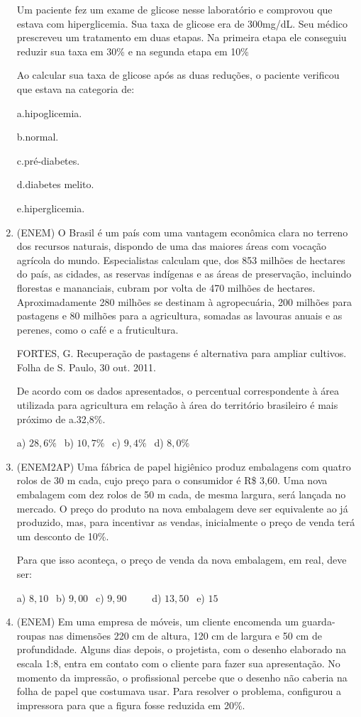 \begin{multicols*}{2}
\begin{enumerate}
Um paciente fez um exame de glicose nesse laboratório e comprovou que estava com hiperglicemia. Sua taxa de
glicose era de 300mg/dL. Seu médico prescreveu um tratamento em duas etapas. Na primeira etapa ele
conseguiu reduzir sua taxa em 30\% e na segunda etapa em 10\%

Ao calcular sua taxa de glicose após as duas reduções, o paciente verificou que estava na categoria de:

a.hipoglicemia.

b.normal.

c.pré-diabetes.

d.diabetes melito.

e.hiperglicemia.


		\item (ENEM) O Brasil é um país com uma vantagem econômica clara no terreno dos recursos naturais, dispondo de uma das maiores áreas com vocação agrícola do mundo. Especialistas calculam que, dos 853 milhões de hectares do país, as cidades, as reservas indígenas e as áreas de preservação, incluindo florestas e mananciais, cubram por volta de 470 milhões de hectares. Aproximadamente 280 milhões se destinam à agropecuária, 200 milhões para pastagens e 80 milhões para a agricultura, somadas as lavouras anuais e as perenes, como o café e a fruticultura.

FORTES, G. Recuperação de pastagens é alternativa para ampliar cultivos. Folha de S. Paulo, 30 out. 2011.

De acordo com os dados apresentados, o percentual correspondente à área utilizada para agricultura em relação à área do território brasileiro é mais próximo de a.32,8\%.

		a) $28,6\% \ \ $ b) $10,7\% \ \ $ c) $ 9,4\% \ \ $ d) $ 8,0\% $

		\item (ENEM2AP) Uma fábrica de papel higiênico produz embalagens com quatro rolos de 30 m cada, cujo preço
para o consumidor é R\$ 3,60. Uma nova embalagem com dez rolos de 50 m cada, de mesma largura, será lançada no
mercado. O preço do produto na nova embalagem deve ser equivalente ao já produzido, mas, para incentivar as
vendas, inicialmente o preço de venda terá um desconto de 10\%.

Para que isso aconteça, o preço de venda da nova embalagem, em real, deve ser:

		a) $8,10 \ \ $ b) $9,00 \ \ $ c) $9,90 \ \ \ \ \ \ \ \ \ \ $ d) $13,50 \ \ $ e) $15 \ \ $

		\item (ENEM) Em uma empresa de móveis, um cliente encomenda um guarda-roupas nas dimensões 220 cm de
altura, 120 cm de largura e 50 cm de profundidade. Alguns dias depois, o projetista, com o desenho elaborado na
escala 1:8, entra em contato com o cliente para fazer sua apresentação. No momento da impressão, o profissional
percebe que o desenho não caberia na folha de papel que costumava usar. Para resolver o problema, configurou a
impressora para que a figura fosse reduzida em 20\%.


\end{enumerate}
\end{multicols*}
